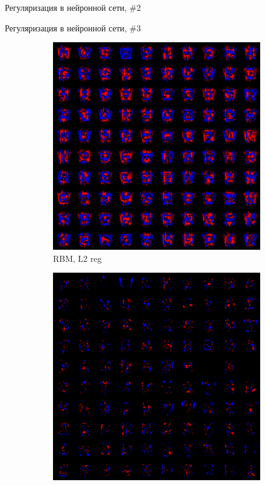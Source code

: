 \documentclass[10pt]{beamer}
\begin{document}
\begin{frame}{Регуляризация в нейронной сети, \#2}
\end{frame}

\begin{frame}{Регуляризация в нейронной сети, \#3}

\begin{figure}
        \begin{subfigure}[b]{0.5\textwidth}
                \includegraphics[width=1\textwidth]{images/rbm_colmap_l2.png}
                \caption{RBM, L2 reg}                
        \end{subfigure}%
        \begin{subfigure}[b]{0.5\textwidth}
                \includegraphics[width=1\textwidth]{images/rbm_colmap_l1.png}

\end{subfigure}
\end{figure}
\end{frame}
\end{document}
